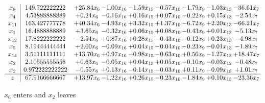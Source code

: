 \documentclass[9pt]{article}
\begin{document}
 \[\begin{array}{c| c c@{\hskip 2pt} c@{\hskip 2pt} c@{\hskip 2pt} c@{\hskip 2pt} c@{\hskip 2pt} c@{\hskip 2pt} c@{\hskip 2pt} }
 x_{8}   &  149.722222222 & + 25.84 x_{6} & -1.00 x_{16} & -1.59 x_{15} & -0.57 x_{10} & -1.79 x_{9} & -1.03 x_{13} & -36.61 x_{7}\\
 x_{4}   &  4.53888888889 & +  0.24 x_{6} & -0.16 x_{16} & +  0.16 x_{15} & +  0.07 x_{10} & -0.22 x_{9} & +  0.15 x_{13} & -2.54 x_{7}\\
 x_{11}   &  163.427777778 & + 40.34 x_{6} & -4.93 x_{16} & +  3.32 x_{15} & +  1.37 x_{10} & -6.72 x_{9} & +  2.20 x_{13} & -66.21 x_{7}\\
 x_{1}   &  16.4888888889 & +  3.65 x_{6} & -0.32 x_{16} & +  0.06 x_{15} & +  0.08 x_{10} & -0.43 x_{9} & +  0.01 x_{13} & -5.13 x_{7}\\
 x_{12}   &  17.8222222222 & -2.54 x_{6} & +  0.87 x_{16} & +  0.28 x_{15} & -0.43 x_{10} & -0.12 x_{9} & +  0.23 x_{13} & -4.98 x_{7}\\
 x_{5}   &  8.19444444444 & +  2.00 x_{6} & -0.09 x_{16} & +  0.04 x_{15} & -0.04 x_{10} & -0.23 x_{9} & -0.01 x_{13} & -1.89 x_{7}\\
 x_{14}   &  3.51111111111 & + 13.70 x_{6} & +  0.97 x_{16} & -0.98 x_{15} & -0.63 x_{10} & +  0.56 x_{9} & -1.27 x_{13} & + 18.47 x_{7}\\
 x_{3}   &  2.10555555556 & +  0.63 x_{6} & -0.05 x_{16} & +  0.04 x_{15} & +  0.05 x_{10} & -0.10 x_{9} & -0.03 x_{13} & -0.48 x_{7}\\
 x_{2}   &  0.972222222222 & -0.55 x_{6} & +  0.13 x_{16} & -0.14 x_{15} & -0.03 x_{10} & +  0.11 x_{9} & -0.09 x_{13} & +  1.01 x_{7}\\
\hline
z    &  67.9166666667 & + 13.97 x_{6} & -1.22 x_{16} & +  0.26 x_{15} & -0.23 x_{10} & -1.84 x_{9} & +  0.10 x_{13} & -23.36 x_{7}\\
\end{array}\]


 $ x_{6} $ enters and $ x_{2} $ leaves 
\end{document}
